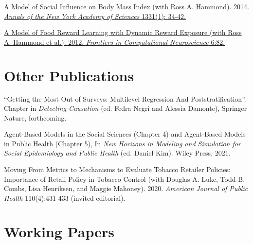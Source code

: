 \documentclass[margin,line]{res}
\newenvironment{publist}{
	\begin{list}{}{%
			\setlength{\itemsep}{0.15in}
			\setlength{\parsep}{0in} \setlength{\parskip}{0in}
			\setlength{\topsep}{0in} \setlength{\partopsep}{0in} 
			\setlength{\leftmargin}{0.15in}
			\setlength{\itemindent}{-0.15in}}}
		{\end{list}}
\begin{document}
\begin{resume}
\begin{publist}
	\item \href{https://joeornstein.github.io/publications/Hammond_et_al-2014-Annals_of_the_New_York_Academy_of_Sciences.pdf}{A Model of Social Influence on Body Mass Index (with Ross A. Hammond). 2014. \textit{Annals of the New York Academy of Sciences} 1331(1): 34-42.}
	
	\item \href{https://joeornstein.github.io/publications/Hammond-2012.pdf}{A Model of Food Reward Learning with Dynamic Reward Exposure (with Ross A. Hammond et al.). 2012. \textit{Frontiers in Computational Neuroscience} 6:82.}	
\end{publist}





\section{\sc Other Publications}

\begin{publist}
	\item ``Getting the Most Out of Surveys: Multilevel Regression And Poststratification''. Chapter in \textit{Detecting Causation} (ed. Fedra Negri and Alessia Damonte), Springer Nature, forthcoming.
	\item Agent-Based Models in the Social Sciences (Chapter 4) and Agent-Based Models in Public Health (Chapter 5), In \textit{New Horizons in Modeling and Simulation for Social Epidemiology and Public Health} (ed. Daniel Kim). Wiley Press, 2021. 
	\item Moving From Metrics to Mechanisms to Evaluate Tobacco Retailer Policies: Importance of Retail Policy in Tobacco Control (with Douglas A. Luke, Todd B. Combs, Lisa Henriksen, and Maggie Mahoney). 2020. \textit{American Journal of Public Health} 110(4):431-433 (invited editorial).
\end{publist}



\section{\sc Working Papers}


\end{resume}
\end{document}
